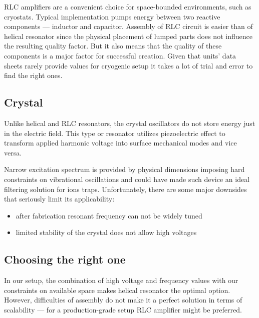 RLC amplifiers are a convenient choice for space-bounded environments, such as cryostats. Typical implementation pumps energy between two reactive components --- inductor and capacitor. Assembly of RLC circuit is easier than of helical resonator since the physical placement of lumped parts does not influence the resulting quality factor. But it also means that the quality of these components is a major factor for successful creation. Given that units' data sheets rarely provide values for cryogenic setup it takes a lot of trial and error to find the right ones.
\subsection{Crystal}
Unlike helical and RLC resonators, the crystal oscillators do not store energy just in the electric field. This type or resonator utilizes piezoelectric effect to transform applied harmonic voltage into surface mechanical modes and vice versa.

Narrow excitation spectrum is provided by physical dimensions imposing hard constraints on vibrational oscillations and could have made such device an ideal filtering solution for ions traps. Unfortunately, there are some major downsides that seriously limit its applicability:
\begin{itemize}
	\item after fabrication resonant frequency can not be widely tuned
	\item limited stability of the crystal does not allow high voltages
\end{itemize}
\subsection{Choosing the right one}
In our setup, the combination of high voltage and frequency values with our constraints on available space makes helical resonator the optimal option. However, difficulties of assembly do not make it a perfect solution in terms of scalability --- for a production-grade setup RLC amplifier might be preferred.